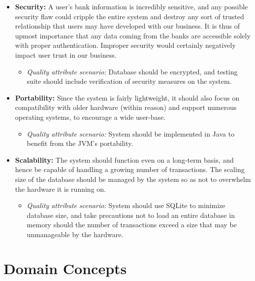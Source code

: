 \documentclass[11pt]{article}
\newcounter{use case ID}
\begin{document}
\begin{itemize}
\begin{itemize}
        \end{itemize}
    \item \textbf{Security:} A user's bank information is incredibly sensitive, and any possible security flaw could cripple the entire system and destroy any sort of trusted relationship that users may have developed with our business. It is thus of upmost importance that any data coming from the banks are accessible solely with proper authentication. Improper security would certainly negatively impact user trust in our business.
        \begin{itemize}
            \item \textit{Quality attribute scenario:} Database should be encrypted, and testing suite should include verification of security measures on the system.
        \end{itemize}
    \item \textbf{Portability:} Since the system is fairly lightweight, it should also focus on compatibility with older hardware (within reason) and support numerous operating systems, to encourage a wide user-base.
        \begin{itemize}
            \item \textit{Quality attribute scenario:} System should be implemented in Java to benefit from the JVM's portability.
        \end{itemize}
    \item \textbf{Scalability:} The system should function even on a long-term basis, and hence be capable of handling a growing number of transactions. The scaling size of the database should be managed by the system so as not to overwhelm the hardware it is running on.
        \begin{itemize}
            \item \textit{Quality attribute scenario:} System should use SQLite to minimize database size, and take precautions not to load an entire database in memory should the number of transactions exceed a size that may be unmanageable by the hardware.
        \end{itemize}
\end{itemize}

\section{Domain Concepts}


\end{document}
